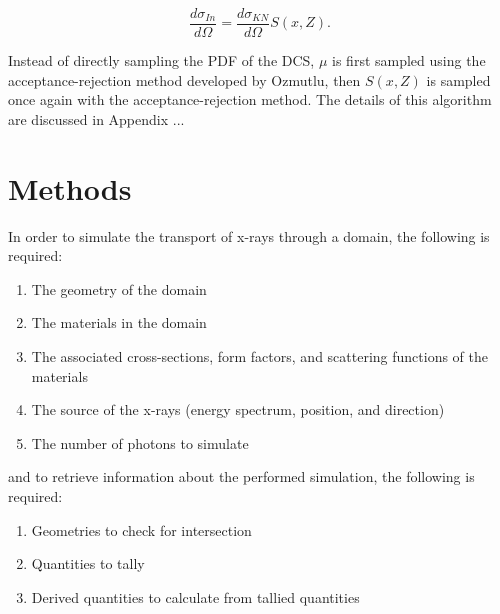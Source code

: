 \begin{equation}
    \frac{d\sigma_{In}}{d\Omega} = \frac{d\sigma_{KN}}{d\Omega} S(x, Z).
\end{equation}

\par Instead of directly sampling the PDF of the DCS, $\mu$ is first sampled using the acceptance-rejection method developed by Ozmutlu, then $S(x, Z)$ is sampled once again with the acceptance-rejection method. The details of this algorithm are discussed in Appendix ... \\

\section{Methods}

In order to simulate the transport of x-rays through a domain, the following is required:

\begin{enumerate}
    \item The geometry of the domain
    \item The materials in the domain
    \item The associated cross-sections, form factors, and scattering functions of the materials
    \item The source of the x-rays (energy spectrum, position, and direction)
    \item The number of photons to simulate
\end{enumerate}

and to retrieve information about the performed simulation, the following is required:

\begin{enumerate}
    \item Geometries to check for intersection
    \item Quantities to tally
    \item Derived quantities to calculate from tallied quantities
\end{enumerate}

